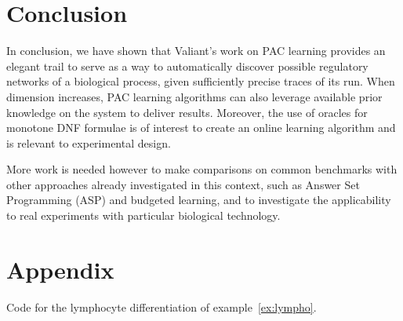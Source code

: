 \documentclass{llncs}
\begin{document}
\section{Conclusion}

In conclusion, we have shown that Valiant's work on PAC learning provides an elegant trail to serve as a way to automatically discover possible regulatory networks of a biological process, given sufficiently precise traces of its run.
When dimension increases, PAC learning algorithms can also leverage available prior knowledge on the system to deliver results.
Moreover, the use of oracles for monotone DNF formulae is of interest to create an online learning algorithm
and is relevant to experimental design.

More work is needed however to make comparisons on common benchmarks
with  other approaches already investigated in this context, such as Answer Set Programming (ASP) and budgeted learning,
and to investigate the applicability to real experiments with particular biological technology.




\section*{Appendix}
\begin{listfig}[H]

\caption{Code for the lymphocyte differentiation of example~\ref{ex:lympho}.\label{bool-lympho}}
\end{listfig}
\end{document}

